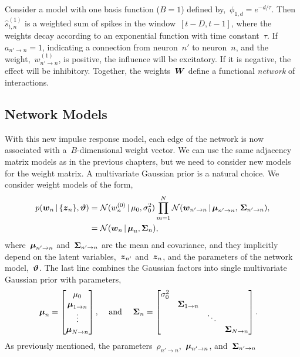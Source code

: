 Consider a model with one basis function ($B=1$) defined
by,~${\phi_{1,d} = e^{-d/\tau}}$.
Then~$\widehat{s}_{t,n}^{(1)}$ is a weighted sum of spikes in the
window~$[t-D,t-1]$, where the weights decay
according to an exponential function with time constant~$\tau$.  
If~${a_{n' \to n}=1}$, indicating a
connection from neuron~$n'$ to neuron~$n$, and
the weight,~$w_{n' \to n}^{(1)}$, is positive, the influence will be
excitatory. If it is negative, the effect will be inhibitory.
Together, the weights~$\boldsymbol{W}$ define a functional \emph{network} of
interactions.

\subsection{Network Models}
With this new impulse response model, each edge of the network 
is now associated with a~$B$-dimensional weight vector. We can 
use the same adjacency matrix models as in the previous chapters,
but we need to consider new models for the weight matrix. A 
multivariate Gaussian prior is a natural choice. We consider 
weight models of the form,
\begin{align*}
  p(\boldsymbol{w}_n \,|\, \{\boldsymbol{z}_n\}, \boldsymbol{\vartheta}) 
  &= \mathcal{N}(w_n^{(0)} \,|\, \mu_0, \sigma^2_0 ) \prod_{m=1}^N 
     \mathcal{N}(\boldsymbol{w}_{n' \to n} \,|\, \boldsymbol{\mu}_{n' \to n}, \, \boldsymbol{\Sigma}_{n' \to n}), \\
  &= \mathcal{N}(\boldsymbol{w}_n \,|\, \boldsymbol{\mu}_n, \boldsymbol{\Sigma}_n),
\end{align*}
where~$\boldsymbol{\mu}_{n' \to n}$ and~$\boldsymbol{\Sigma}_{n' \to n}$ are the mean and covariance,
and they implicitly depend on the latent variables,~$\boldsymbol{z}_{n'}$ and~$\boldsymbol{z}_n$, and
the parameters of the network model,~$\boldsymbol{\vartheta}$.
The last line combines the Gaussian factors into single multivariate Gaussian prior
with parameters,
\begin{align}
  \boldsymbol{\mu}_n 
    &= \begin{bmatrix}
      \mu_0 \\
      \boldsymbol{\mu}_{1 \to n} \\
      \vdots \\
      \boldsymbol{\mu}_{N \to n}
    \end{bmatrix}, & \text{ and } & &
  \boldsymbol{\Sigma}_n 
  &= \begin{bmatrix}
    \sigma_0^2 &                     &        & \\
               & \boldsymbol{\Sigma}_{1 \to n}   &        & \\
               &                     & \ddots & \\
               &                     &        & \boldsymbol{\Sigma}_{N \to n} 
    \end{bmatrix}.
\end{align}
As previously mentioned, the parameters~$\rho_{n' \to n}$,~$\boldsymbol{\mu}_{n' \to n}$, and~$\boldsymbol{\Sigma}_{n' \to n}$ 

